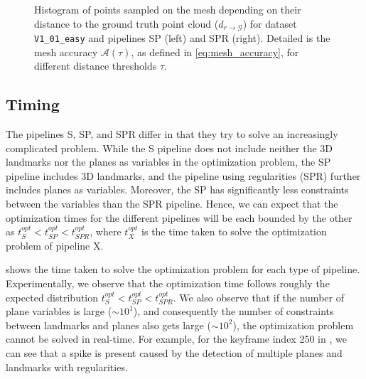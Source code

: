 \begin{figure}[tb]
  \centering     %

  \caption{Histogram of points sampled on the mesh depending on their distance to the ground truth point cloud ($d_{r \to \mathcal{G}}$) for dataset \texttt{V1\_01\_easy} and pipelines SP (left) and SPR (right).
  Detailed is the mesh accuracy $\mathcal{A}(\tau)$, as defined in \cref{eq:mesh_accuracy}, for different distance thresholds $\tau$.}
  \label{fig:histogram_accuracy_mesh}
\end{figure}

\subsection{Timing}
\label{ssec:timing}

The pipelines S, SP, and SPR differ in that they try to solve an increasingly complicated problem.
While the S pipeline does not include neither the 3D landmarks nor the planes as variables in the optimization problem, the SP pipeline includes 3D landmarks, and the pipeline using regularities (SPR) further includes planes as variables.
Moreover, the SP has significantly less constraints between the variables than the SPR pipeline.
Hence, we can expect that the optimization times for the different pipelines will be each bounded by the other as $t_{S}^{opt} < t_{SP}^{opt} < t_{SPR}^{opt}$, where $t_{X}^{opt}$ is the time taken to solve the optimization problem of pipeline X.

 shows the time taken to solve the optimization problem for each type of pipeline.
Experimentally, we observe that the optimization time follows roughly the expected distribution $t_{S}^{opt} < t_{SP}^{opt} < t_{SPR}^{opt}$.
We also observe that if the number of plane variables is large ($\sim 10^1$), and consequently the number of constraints between landmarks and planes also gets large ($\sim 10^2$), the optimization problem cannot be solved in real-time.
For example, for the keyframe index 250 in , we can see that a spike is present caused by the detection of multiple planes and landmarks with regularities.

